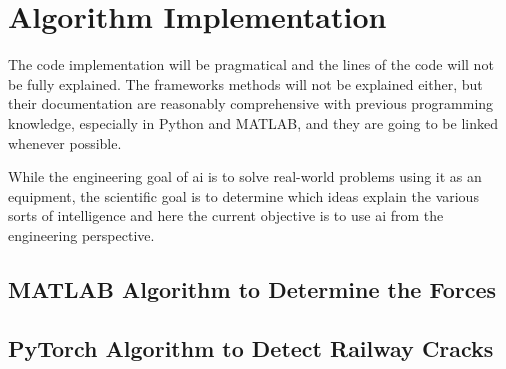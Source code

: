 \section{Algorithm Implementation}

The code implementation will be pragmatical and the lines of the code will not be fully explained. The frameworks methods will not be explained either, but their documentation are reasonably comprehensive with previous programming knowledge, especially in Python and MATLAB, and they are going to be linked whenever possible.

While the engineering goal of \gls*{ai} is to solve real-world problems using it as an equipment, the scientific goal is to determine which ideas explain the various sorts of intelligence \citep{winston1992} and here the current objective is to use \gls*{ai} from the engineering perspective.

\subsection{MATLAB Algorithm to Determine the Forces}

\subsection{PyTorch Algorithm to Detect Railway Cracks}
